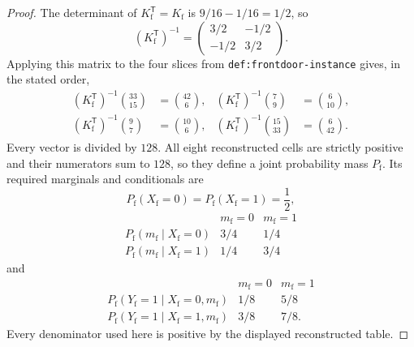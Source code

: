 \documentclass{article}
\begin{document}
\begin{proof}
The determinant of \(K_{\mathrm f}^{\mathsf T}=K_{\mathrm f}\) is \(9/16-1/16=1/2\), so
\[
 (K_{\mathrm f}^{\mathsf T})^{-1}
 =\begin{pmatrix}3/2&-1/2\\-1/2&3/2\end{pmatrix}.
\]
Applying this matrix to the four slices from \texttt{def:frontdoor-instance} gives, in the stated order,
\[
\begin{aligned}
 (K_{\mathrm f}^{\mathsf T})^{-1}\binom{33}{15}&=\binom{42}{6},&
 (K_{\mathrm f}^{\mathsf T})^{-1}\binom{7}{9}&=\binom{6}{10},\\
 (K_{\mathrm f}^{\mathsf T})^{-1}\binom{9}{7}&=\binom{10}{6},&
 (K_{\mathrm f}^{\mathsf T})^{-1}\binom{15}{33}&=\binom{6}{42}.
\end{aligned}
\]
Every vector is divided by \(128\).  All eight reconstructed cells are strictly positive and their numerators sum to \(128\), so they define a joint probability mass \(P_{\mathrm f}\).  Its required marginals and conditionals are
\[
 P_{\mathrm f}(X_{\mathrm f}=0)=P_{\mathrm f}(X_{\mathrm f}=1)=\frac12,
\]
\[
\begin{array}{c|cc}
 &m_{\mathrm f}=0&m_{\mathrm f}=1\\ \hline
 P_{\mathrm f}(m_{\mathrm f}\mid X_{\mathrm f}=0)&3/4&1/4\\
 P_{\mathrm f}(m_{\mathrm f}\mid X_{\mathrm f}=1)&1/4&3/4
\end{array}
\]
and
\[
\begin{array}{c|cc}
 &m_{\mathrm f}=0&m_{\mathrm f}=1\\ \hline
 P_{\mathrm f}(Y_{\mathrm f}=1\mid X_{\mathrm f}=0,m_{\mathrm f})&1/8&5/8\\
 P_{\mathrm f}(Y_{\mathrm f}=1\mid X_{\mathrm f}=1,m_{\mathrm f})&3/8&7/8.
\end{array}
\]
Every denominator used here is positive by the displayed reconstructed table.


\end{proof}
\end{document}
